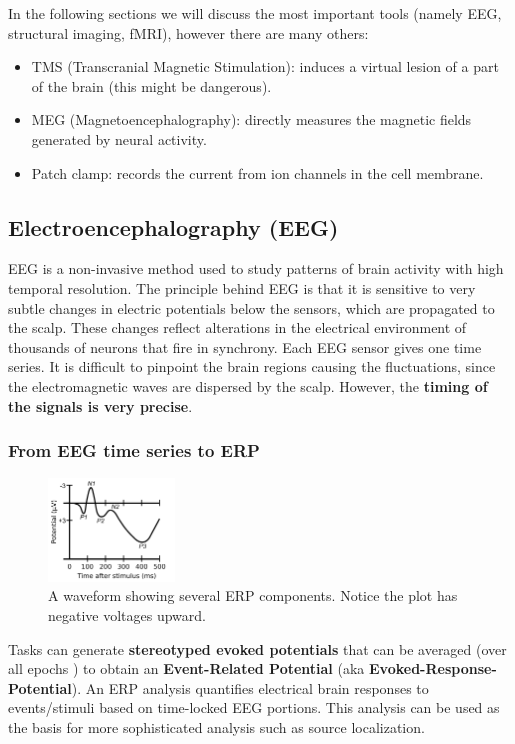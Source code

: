 In the following sections we will discuss the most important tools (namely EEG, structural imaging, fMRI), however there are many others:
\begin{itemize}
    \item TMS (Transcranial Magnetic Stimulation): induces a virtual lesion of a part of the brain (this might be dangerous).
    \item MEG (Magnetoencephalography): directly measures the magnetic fields generated by neural activity.
    \item Patch clamp: records the current from ion channels in the cell membrane.
\end{itemize}

\subsection{Electroencephalography (EEG)}
EEG is a non-invasive method used to study patterns of brain activity with high temporal resolution.
The principle behind EEG is that it is sensitive to very subtle changes in electric potentials below the sensors, which are propagated to the scalp. These changes reflect alterations in the electrical environment of thousands of neurons that fire in synchrony. Each EEG sensor gives one time series.
It is difficult to pinpoint the brain regions causing the fluctuations, since the electromagnetic waves are dispersed by the scalp. However, the \textbf{timing of the signals is very precise}.

\subsubsection{From EEG time series to ERP}
\begin{figure}
  \centering \includegraphics[width=0.3\textwidth]{images/ComponentsofERP.png}
  \caption*{A waveform showing several ERP components. Notice the plot has negative voltages upward.}
\end{figure}

Tasks can generate \textbf{stereotyped evoked potentials} that can be averaged (over all epochs \notet) to obtain an \textbf{Event-Related Potential} (aka \textbf{Evoked-Response-Potential}). An ERP analysis quantifies electrical brain responses to events/stimuli based on time-locked EEG portions. This analysis can be used as the basis for more sophisticated analysis such as source localization.


